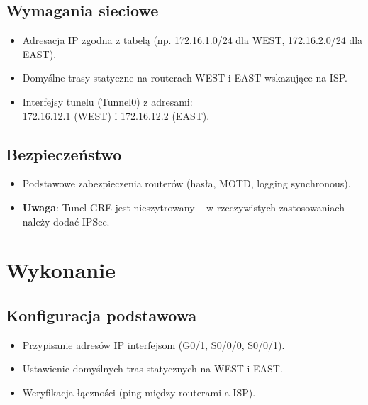 \documentclass[12pt,twoside,a4paper,openany]{article}
\begin{document}
\subsection{Wymagania sieciowe}
\begin{itemize}
    \item Adresacja IP zgodna z tabelą (np. 172.16.1.0/24 dla WEST, 172.16.2.0/24 dla EAST).    \item Domyślne trasy statyczne na routerach WEST i EAST wskazujące na ISP.
    \item Interfejsy tunelu (Tunnel0) z adresami:\\ 172.16.12.1 (WEST) i 172.16.12.2 (EAST).
\end{itemize}

\subsection{Bezpieczeństwo}
\begin{itemize}
    \item Podstawowe zabezpieczenia routerów (hasła, MOTD, logging synchronous).
    \item \textbf{Uwaga}: Tunel GRE jest nieszytrowany – w rzeczywistych zastosowaniach należy dodać IPSec.
\end{itemize}

\section{Wykonanie}

\subsection{Konfiguracja podstawowa}
\begin{itemize}
    \item Przypisanie adresów IP interfejsom (G0/1, S0/0/0, S0/0/1).
    \item Ustawienie domyślnych tras statycznych na WEST i EAST.
    \item Weryfikacja łączności (ping między routerami a ISP).
\end{itemize}
\end{document}

